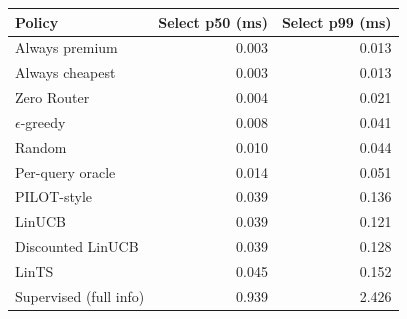 \begin{tabular}{lrr}
\toprule
Policy & Select p50 (ms) & Select p99 (ms) \\
\midrule
Always premium & 0.003 & 0.013 \\
Always cheapest & 0.003 & 0.013 \\
Zero Router & 0.004 & 0.021 \\
$\epsilon$-greedy & 0.008 & 0.041 \\
Random & 0.010 & 0.044 \\
Per-query oracle & 0.014 & 0.051 \\
PILOT-style & 0.039 & 0.136 \\
LinUCB & 0.039 & 0.121 \\
Discounted LinUCB & 0.039 & 0.128 \\
LinTS & 0.045 & 0.152 \\
Supervised (full info) & 0.939 & 2.426 \\
\bottomrule
\end{tabular}